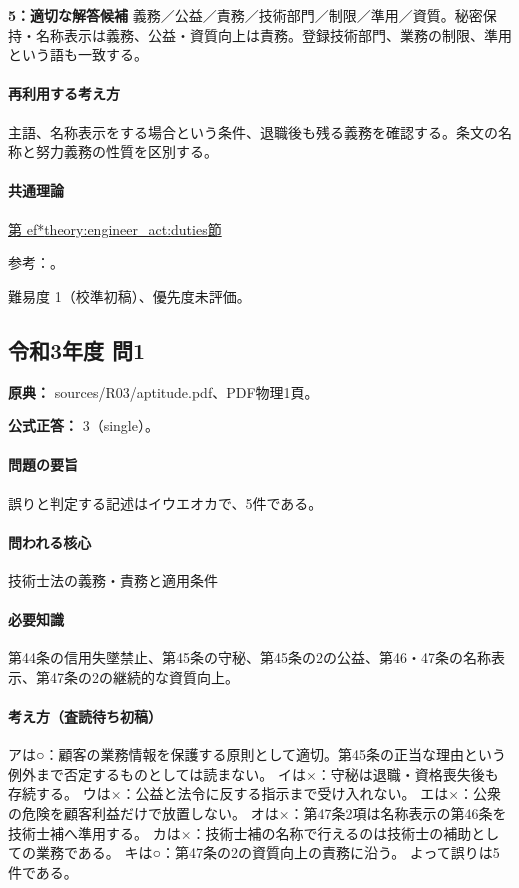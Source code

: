 \noindent\textbf{5：適切な解答候補} 義務／公益／責務／技術部門／制限／準用／資質。秘密保持・名称表示は義務、公益・資質向上は責務。登録技術部門、業務の制限、準用という語も一致する。\par

\paragraph{再利用する考え方} 主語、名称表示をする場合という条件、退職後も残る義務を確認する。条文の名称と努力義務の性質を区別する。

\paragraph{共通理論} \hyperref[theory:engineer_act:duties]{第
ef*{theory:engineer_act:duties}節}

\par 参考：\cite{engineer_act_current}。

\par 難易度 1（校準初稿）、優先度未評価。

\subsection{令和3年度 問1}
\label{q:r03-reg-apt-01}

\noindent\textbf{原典：} sources/R03/aptitude.pdf、PDF物理1頁。

\textbf{公式正答：} 3（single）。

\paragraph{問題の要旨} 誤りと判定する記述はイウエオカで、5件である。

\paragraph{問われる核心} 技術士法の義務・責務と適用条件

\paragraph{必要知識} 第44条の信用失墜禁止、第45条の守秘、第45条の2の公益、第46・47条の名称表示、第47条の2の継続的な資質向上。

\paragraph{考え方（査読待ち初稿）} アは○：顧客の業務情報を保護する原則として適切。第45条の正当な理由という例外まで否定するものとしては読まない。 イは×：守秘は退職・資格喪失後も存続する。 ウは×：公益と法令に反する指示まで受け入れない。 エは×：公衆の危険を顧客利益だけで放置しない。 オは×：第47条2項は名称表示の第46条を技術士補へ準用する。 カは×：技術士補の名称で行えるのは技術士の補助としての業務である。 キは○：第47条の2の資質向上の責務に沿う。 よって誤りは5件である。

